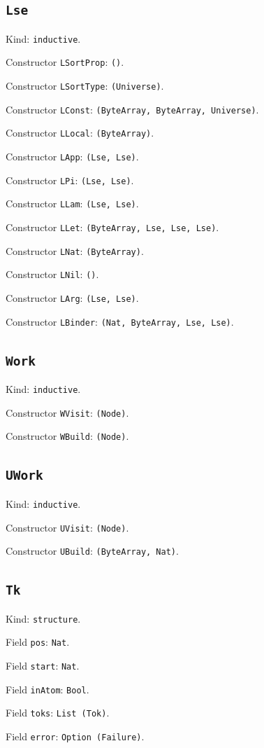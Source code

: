 \documentclass[11pt]{article}
\begin{document}
\subsection*{\texttt{Lse}}
\noindent Kind: \texttt{inductive}.\par
\noindent Constructor \texttt{LSortProp}: \texttt{()}.\par
\noindent Constructor \texttt{LSortType}: \texttt{(Universe)}.\par
\noindent Constructor \texttt{LConst}: \texttt{(ByteArray, ByteArray, Universe)}.\par
\noindent Constructor \texttt{LLocal}: \texttt{(ByteArray)}.\par
\noindent Constructor \texttt{LApp}: \texttt{(Lse, Lse)}.\par
\noindent Constructor \texttt{LPi}: \texttt{(Lse, Lse)}.\par
\noindent Constructor \texttt{LLam}: \texttt{(Lse, Lse)}.\par
\noindent Constructor \texttt{LLet}: \texttt{(ByteArray, Lse, Lse, Lse)}.\par
\noindent Constructor \texttt{LNat}: \texttt{(ByteArray)}.\par
\noindent Constructor \texttt{LNil}: \texttt{()}.\par
\noindent Constructor \texttt{LArg}: \texttt{(Lse, Lse)}.\par
\noindent Constructor \texttt{LBinder}: \texttt{(Nat, ByteArray, Lse, Lse)}.\par
\subsection*{\texttt{Work}}
\noindent Kind: \texttt{inductive}.\par
\noindent Constructor \texttt{WVisit}: \texttt{(Node)}.\par
\noindent Constructor \texttt{WBuild}: \texttt{(Node)}.\par
\subsection*{\texttt{UWork}}
\noindent Kind: \texttt{inductive}.\par
\noindent Constructor \texttt{UVisit}: \texttt{(Node)}.\par
\noindent Constructor \texttt{UBuild}: \texttt{(ByteArray, Nat)}.\par
\subsection*{\texttt{Tk}}
\noindent Kind: \texttt{structure}.\par
\noindent Field \texttt{pos}: \texttt{Nat}.\par
\noindent Field \texttt{start}: \texttt{Nat}.\par
\noindent Field \texttt{inAtom}: \texttt{Bool}.\par
\noindent Field \texttt{toks}: \texttt{List (Tok)}.\par
\noindent Field \texttt{error}: \texttt{Option (Failure)}.\par
\end{document}
